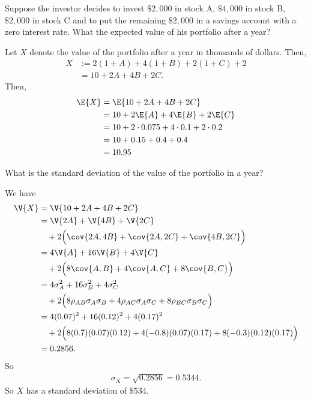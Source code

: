 \begin{exercise}
Suppose the investor decides to invest $\$ 2,000$ in stock A, $\$4,000$ in stock B, $\$2,000$ in stock C and to put the remaining $\$ 2,000$ in a savings account with a zero interest rate. What the expected value of his portfolio after a year?
\begin{solution}
Let $X$ denote the value of the portfolio after a year in thousands of dollars. Then,
\begin{align}
    X &:= 2(1 + A) + 4(1 + B) + 2(1 + C) + 2 \\
    &= 10 + 2A + 4B + 2C.
\end{align}
Then,
\begin{align}
    \E{X} &= \E{ 10 + 2A + 4B + 2C } \\
    &= 10 + 2\E{A} + 4\E{B} + 2\E{C} \\
    &= 10 + 2\cdot 0.075  + 4 \cdot 0.1  + 2 \cdot 0.2 \\
    &= 10 + 0.15  + 0.4  + 0.4 \\
    &= 10.95
\end{align}
\end{solution}
\end{exercise}

\begin{exercise}
What is the standard deviation of the value of the portfolio in a year?
\begin{solution}
We have
\begin{align}
    \V{X} &= \V{ 10 + 2A + 4B + 2C} \\
    &= \V{2A} + \V{4B} + \V{2C} \\
    &\quad +2\Big( \cov{2A, 4B} + \cov{2A, 2C} + \cov{4B, 2C} \Big) \\
    &= 4\V{A} + 16\V{B} + 4\V{C}\\
    &\quad +2\Big( 8\cov{A, B} + 4\cov{A, C} + 8\cov{B, C} \Big) \\
    &= 4\sigma_A^2 + 16\sigma_B^2 + 4\sigma_C^2 \\
    &\quad +2\Big( 8\rho_{AB}\sigma_A \sigma_B + 4\rho_{AC}\sigma_A \sigma_C + 8\rho_{BC}\sigma_B \sigma_C \Big) \\
    &= 4(0.07)^2 + 16(0.12)^2 + 4(0.17)^2 \\
    &\quad +2\Big( 8(0.7)(0.07) (0.12) + 4(-0.8)(0.07)(0.17) + 8(-0.3)(0.12) (0.17)\Big) \\
    &= 0.2856.
\end{align}
So
\begin{align}
    \sigma_X = \sqrt{0.2856} = 0.5344.
\end{align}
So $X$ has a standard deviation of $\$534$.
\end{solution}
\end{exercise}

